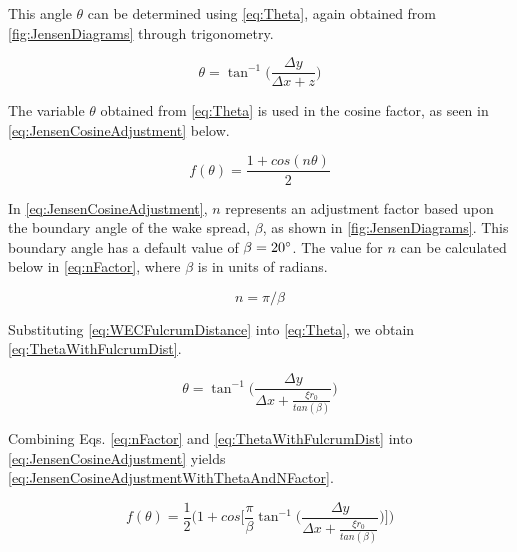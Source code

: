 \documentclass[a4paper]{jpconf}
\begin{document}
This angle $\theta$ can be determined using \cref{eq:Theta}, again obtained from \cref{fig:JensenDiagrams} through trigonometry.

\begin{equation}
    \theta = \tan^{-1}\Big( \frac{\Delta y}{\Delta x + z} \Big)
    \label{eq:Theta}
\end{equation}

The variable $\theta$ obtained from \cref{eq:Theta} is used in the cosine factor, as seen in \cref{eq:JensenCosineAdjustment} below.

\begin{equation}
    f(\theta) = \frac{1 + cos(n\theta)}{2}
    \label{eq:JensenCosineAdjustment}
\end{equation}

In \cref{eq:JensenCosineAdjustment}, $n$ represents an adjustment factor based upon the boundary angle of the wake spread, $\beta$, as shown in \cref{fig:JensenDiagrams}. This boundary angle has a default value of $\beta = 20 \degree$. The value for $n$ can be calculated below in \cref{eq:nFactor}, where $\beta$ is in units of radians.

\begin{equation}
    n = \pi / \beta
    \label{eq:nFactor}
\end{equation}

Substituting \cref{eq:WECFulcrumDistance} into \cref{eq:Theta}, we obtain \cref{eq:ThetaWithFulcrumDist}.

\begin{equation}
    \theta = \tan^{-1}\Bigg( \frac{\Delta y}{\Delta x + \frac{\xi r_0}{tan(\beta)}} \Bigg)
    \label{eq:ThetaWithFulcrumDist}
\end{equation}

Combining Eqs. \cref{eq:nFactor} and \cref{eq:ThetaWithFulcrumDist} into \cref{eq:JensenCosineAdjustment} yields \cref{eq:JensenCosineAdjustmentWithThetaAndNFactor}.

\begin{equation}
    f(\theta) = \frac{1}{2} \Bigg( 1 + cos \Bigg[ \frac{\pi}{\beta} \tan^{-1}\Bigg( \frac{\Delta y}{\Delta x + \frac{\xi r_0}{tan(\beta)}} \Bigg) \Bigg] \Bigg)
    \label{eq:JensenCosineAdjustmentWithThetaAndNFactor}
\end{equation}
\end{document}

